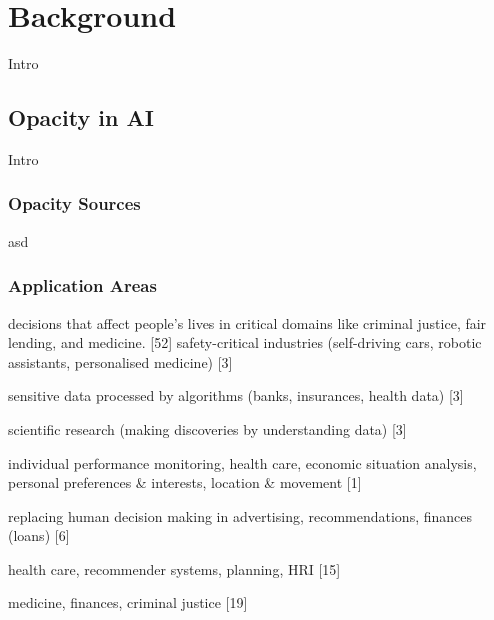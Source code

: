 \section{Background}

Intro


\subsection{Opacity in AI}
Intro

\subsubsection{Opacity Sources}
asd

\subsubsection{Application Areas}
decisions that affect people’s lives in critical domains like criminal
justice, fair lending, and medicine. [52]\newline
safety-critical industries (self-driving cars, robotic assistants, personalised medicine) [3]\newline

sensitive data processed by algorithms (banks, insurances, health data) [3]\newline

scientific research (making discoveries by understanding data) [3]\newline

individual performance monitoring, health care, economic situation analysis, personal preferences \& interests, location \& movement [1]\newline

replacing human decision making in advertising, recommendations, finances (loans) [6] \newline

health care, recommender systems, planning, HRI [15]\newline

medicine, finances, criminal justice [19] \newline


